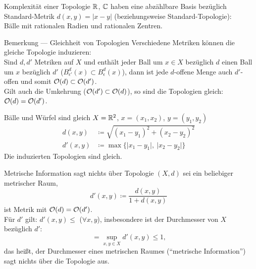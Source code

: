 \begin{example}{Komplexität einer Topologie}
  $ \mathbb{R} $, $ \mathbb{C} $ haben eine abzählbare Basis bezüglich Standard-Metrik $ d(x,y) = \vert x - y \vert $ (beziehungsweise Standard-Topologie): \\
  Bälle mit rationalen Radien und rationalen Zentren.
\end{example}

\begin{bla}{Bemerkung --- Gleichheit von Topologien}
  Verschiedene Metriken können die gleiche Topologie induzieren: \\
  Sind $ d, d' $ Metriken auf $ X $ und enthält jeder Ball um $ x \in X $ bezüglich $ d $ einen Ball um $ x $ bezüglich $ d' $ ($ B_{\epsilon'}^d(x) \subset B_\epsilon^d(x) $), dann ist jede $ d $-offene Menge auch $ d' $-offen und somit $ \mathcal{O}(d) \subset \mathcal{O}(d') $. \\
  Gilt auch die Umkehrung ($ \mathcal{O}(d') \subset \mathcal{O}(d) $), so sind die Topologien gleich: $ \mathcal{O}(d) = \mathcal{O}(d') $.
\end{bla}

\begin{example}{Bälle und Würfel sind gleich}
  $ X = \mathbb{R}^2 $, $ x = (x_1, x_2) $, $ y = (y_1, y_2) $
  \begin{align*}
    d(x,y) &\coloneqq \sqrt{(x_1-y_1)^2+(x_2-y_2)^2} \\
    d'(x,y) &\coloneqq \max\{ \vert x_1-y_1\vert, \ \vert x_2-y_2 \vert \}
  \end{align*}
  Die induzierten Topologien sind gleich.
\end{example}

\begin{example}{Metrische Information sagt nichts über Topologie}
  $ (X, d) $ sei ein beliebiger metrischer Raum,
  \begin{equation*}
    d'(x,y) \coloneqq \frac{d(x,y)}{1 + d(x,y)}
  \end{equation*}
  ist Metrik mit $ \mathcal{O}(d) = \mathcal{O}(d') $. \\
  Für $ d' $ gilt: $ d'(x,y) \leq $ ($ \forall x,y $), insbesondere ist der Durchmesser von $ X $ bezüglich $ d' $:
  \begin{equation*}
    = \sup_{x,y \in X}d'(x,y) \leq 1\text{,}
  \end{equation*}
  das heißt, der Durchmesser eines metrischen Raumes (``metrische Information'') sagt nichts über die Topologie aus.
\end{example}

